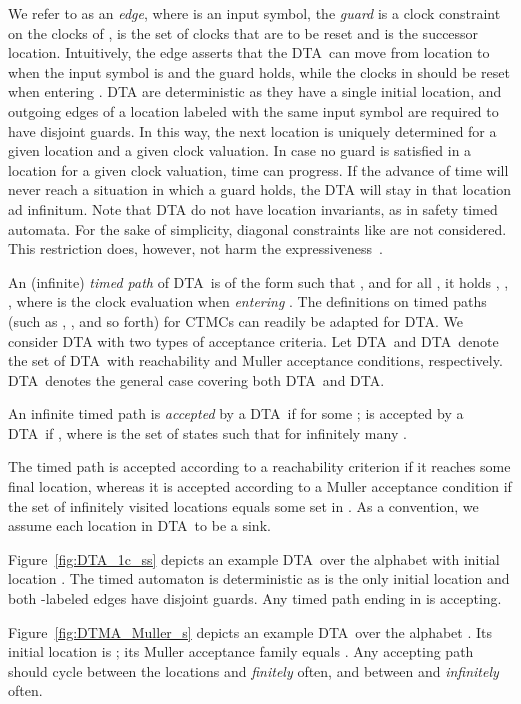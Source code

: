 \documentclass{LMCS}
\newcommand{\<}{\langle}
\renewcommand{\>}{\rangle}
\newcommand{\DTA}{\textsc{DTA}}
\newcommand{\DTAr}{\DTA}
\newcommand{\DTAo}{\DTA}
\begin{document}
We refer to  as an \emph{edge}, where  is an input symbol,
the \emph{guard}  is a clock constraint on the clocks of ,  is the set of
clocks that are to be reset and  is the successor location.
Intuitively, the edge  asserts that the \DTA\  can move from
location  to  when the input symbol is  and the guard  holds, while the
clocks in  should be reset when entering .
DTA are deterministic as they have a single initial location, and outgoing edges of a
location labeled with the same input symbol are required to have disjoint guards.
In this way, the next location is uniquely determined for a given location and a given
clock valuation.
In case no guard is satisfied in a location for a given clock valuation, time can progress.
If the advance of time will never reach a situation in which a guard holds, the DTA will
stay in that location ad infinitum.
Note that DTA do not have location invariants, as in safety timed automata.
For the sake of simplicity, diagonal constraints like  are not considered.
This restriction does, however, not harm the expressiveness~\cite{BPDG98}.

An (infinite) \emph{timed path} of \DTA\  is of the form  such that , and for all , it holds
, , , where 
is the clock evaluation when \emph{entering} .
The definitions on timed paths (such as , , and so forth) for CTMCs
can readily be adapted for DTA.
We consider DTA with two types of acceptance criteria.
Let \DTAr\ and \DTAo\ denote the set of \DTA\ with reachability and Muller acceptance
conditions, respectively.
\DTA\ denotes the general case covering both \DTAr\ and \DTAo.

\begin{defi}
An infinite timed path  is \emph{accepted} by a \DTAr\ if  for
some ;  is accepted by a \DTAo\ if , where  is the set of states  such that  for infinitely many .
\end{defi}

The timed path  is accepted according to a reachability criterion if it reaches
some final location, whereas it is accepted according to a Muller acceptance condition
if the set of infinitely visited locations equals some  set in .
As a convention, we assume each location  in \DTAr\ to be a sink.

\begin{exa}
Figure~\ref{fig:DTA_1c_ss} depicts an example \DTAr\ over the alphabet 
with initial location .
The timed automaton is deterministic as  is the only initial location and both
-labeled edges have disjoint guards.
Any timed path ending in  is accepting.

Figure~\ref{fig:DTMA_Muller_s} depicts an example \DTAo\ over the alphabet .
Its initial location is ; its Muller acceptance family equals .
Any accepting path should cycle between the locations  and  \emph{finitely}
often, and between  and  \emph{infinitely} often.
\end{exa}
\end{document}
